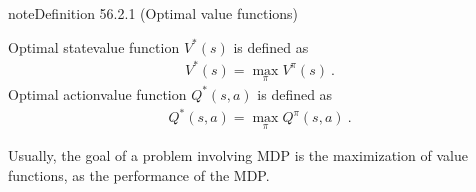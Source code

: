 \documentclass[letterpaper,10pt,english]{jupyterBook}
\begin{document}
\sphinxAtStartPar
{} 

\sphinxAtStartPar
{}
\label{ch/rl/mdp:def:optimal-value-fcns}
\begin{sphinxadmonition}{note}{Definition 56.2.1 (Optimal value functions)}



\sphinxAtStartPar
Optimal state\sphinxhyphen{}value function \(V^*(s)\) is defined as
\begin{equation*}
\begin{split}V^*(s) = \max_{\pi} V^{\pi}(s) \ .\end{split}
\end{equation*}
\sphinxAtStartPar
Optimal action\sphinxhyphen{}value function \(Q^*(s,a)\) is defined as
\begin{equation*}
\begin{split}Q^*(s,a) = \max_{\pi} Q^{\pi}(s,a) \ .\end{split}
\end{equation*}\end{sphinxadmonition}

\sphinxAtStartPar
Usually, the goal of a problem involving MDP is the maximization of value functions, as the performance of the MDP.
\end{document}
